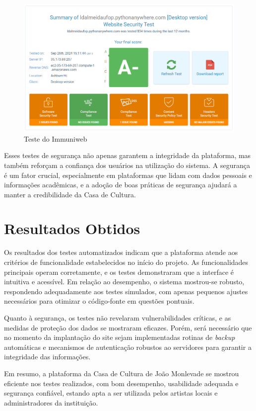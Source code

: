 \begin{figure}[htb] \caption{\label{fig_grafico}Teste do Immuniweb} \begin{center} \includegraphics[scale=0.3]{./img/immuniweb.png} \end{center}  \end{figure}

Esses testes de segurança não apenas garantem a integridade da plataforma, mas também reforçam a confiança dos usuários na utilização do sistema. A segurança é um fator crucial, especialmente em plataformas que lidam com dados pessoais e informações acadêmicas, e a adoção de boas práticas de segurança ajudará a manter a credibilidade da Casa de Cultura.

\section{Resultados Obtidos}


Os resultados dos testes automatizados indicam que a plataforma atende aos critérios de funcionalidade estabelecidos no início do projeto. As funcionalidades principais operam corretamente, e os testes demonstraram que a interface é intuitiva e acessível. Em relação ao desempenho, o sistema mostrou-se robusto, respondendo adequadamente aos testes simulados, com apenas pequenos ajustes necessários para otimizar o código-fonte em questões pontuais.

Quanto à segurança, os testes não revelaram vulnerabilidades críticas, e as medidas de proteção dos dados se mostraram eficazes. Porém, será necessário que no momento da implantação do site sejam implementadas rotinas de \textit{backup} automáticas e mecanismos de autenticação robustos ao servidores para garantir a integridade das informações.

Em resumo, a plataforma da Casa de Cultura de João Monlevade se mostrou eficiente nos testes realizados, com bom desempenho, usabilidade adequada e segurança confiável, estando apta a ser utilizada pelos artistas locais e administradores da instituição.